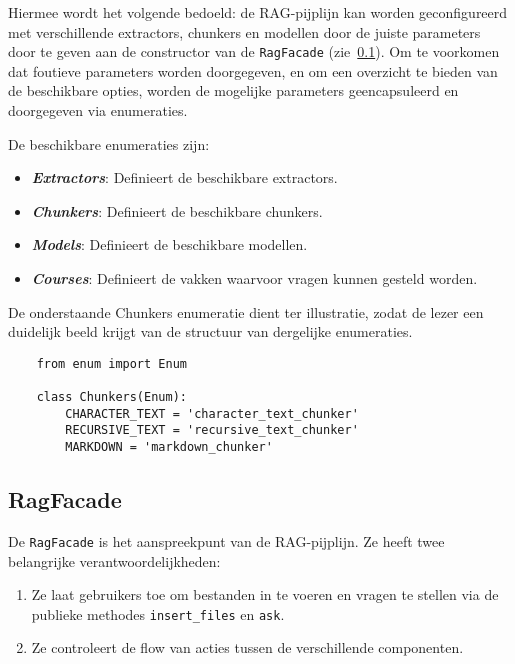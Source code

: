 Hiermee wordt het volgende bedoeld: de RAG-pijplijn kan worden geconfigureerd met verschillende extractors, chunkers en modellen door de juiste parameters door te geven aan de constructor van de \texttt{RagFacade} (zie~\ref{subsec:ragfacade}). Om te voorkomen dat foutieve parameters worden doorgegeven, en om een overzicht te bieden van de beschikbare opties, worden de mogelijke parameters geencapsuleerd en doorgegeven via enumeraties.

De beschikbare enumeraties zijn:

\begin{itemize}
    \item \textbf{\emph{Extractors}}: Definieert de beschikbare extractors.
    \item \textbf{\emph{Chunkers}}: Definieert de beschikbare chunkers.
    \item \textbf{\emph{Models}}: Definieert de beschikbare modellen.
    \item \textbf{\emph{Courses}}: Definieert de vakken waarvoor vragen kunnen gesteld worden.
\end{itemize}

De onderstaande Chunkers enumeratie dient ter illustratie, zodat de lezer een duidelijk beeld krijgt van de structuur van dergelijke enumeraties.

\begin{verbatim}
    from enum import Enum
    
    class Chunkers(Enum):
        CHARACTER_TEXT = 'character_text_chunker'
        RECURSIVE_TEXT = 'recursive_text_chunker'
        MARKDOWN = 'markdown_chunker'
\end{verbatim}

\subsection{RagFacade}%
\label{subsec:ragfacade}

De \texttt{RagFacade} is het aanspreekpunt van de RAG-pijplijn. Ze heeft twee belangrijke verantwoordelijkheden:

\begin{enumerate}
    \item Ze laat gebruikers toe om bestanden in te voeren en vragen te stellen via de publieke methodes \texttt{insert\_files} en \texttt{ask}.
    \item Ze controleert de flow van acties tussen de verschillende componenten.
\end{enumerate}

